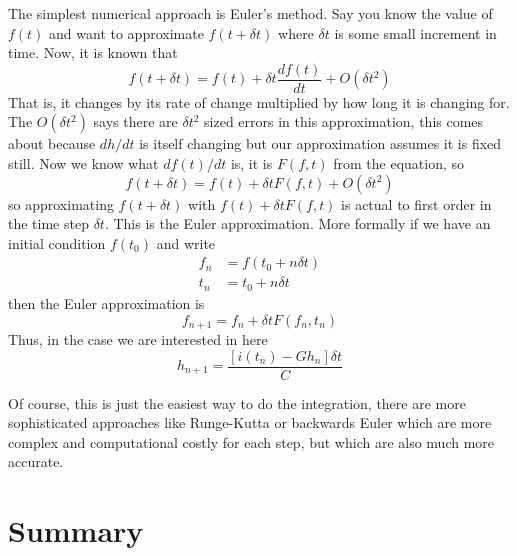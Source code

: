 \documentclass[12pt]{article}
\begin{document}
The simplest numerical approach is Euler's method. Say you know the value of $f(t)$ and want to approximate $f(t+\delta t)$ where $\delta t$ is some small increment in time. Now, it is known that
\begin{equation}
f(t+\delta t)=f(t)+\delta t \frac{df(t)}{dt}+O(\delta t^2)
\end{equation}
That is, it changes by its rate of change multiplied by how long it is
changing for. The $O(\delta t^2)$ says there are $\delta t^2$ sized
errors in this approximation, this comes about because $dh/dt$ is
itself changing but our approximation assumes it is fixed still. Now we
know what $df(t)/dt$ is, it is $F(f,t)$ from the equation, so
\begin{equation}
f(t+\delta t)=f(t)+\delta t F(f,t) + O(\delta t^2)
\end{equation}
so approximating $f(t+\delta t)$ with $f(t)+\delta t F(f,t)$ is actual
to first order in the time step $\delta t$. This is the Euler
approximation. More formally if we have an initial condition $f(t_0)$ and write
\begin{align}
f_n&=f(t_0+n\delta t)\\
t_n&=t_0+n\delta t
\end{align}
then the Euler approximation is
\begin{equation}
f_{n+1}=f_n+\delta t F(f_n,t_n)
\end{equation}
Thus, in the case we are interested in here
\begin{equation}
h_{n+1}=\frac{[i(t_n)-Gh_n]\delta t}{C}
\end{equation}

Of course, this is just the easiest way to do the integration, there
are more sophisticated approaches like Runge-Kutta or backwards Euler
which are more complex and computational costly for each step, but
which are also much more accurate.

\section{Summary}
\end{document}
